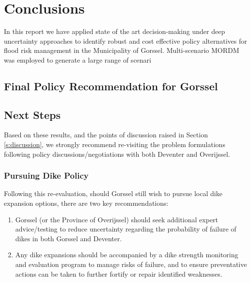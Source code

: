 \section{Conclusions}
\label{s:conc}


In this report we have applied state of the art decision-making under deep uncertainty approaches to identify robust and cost effective policy alternatives for flood risk management in the Municipality of Gorssel. Multi-scenario MORDM was employed to generate a large range of scenari

\subsection{Final Policy Recommendation for Gorssel}

\subsection{Next Steps}
Based on these results, and the points of discussion raised in Section \ref{s:discussion}, we strongly recommend re-visiting the problem formulations following policy discussions/negotiations with both Deventer and Overijssel.

\subsubsection{Pursuing Dike Policy}
Following this re-evaluation, should Gorssel still wish to pursue local dike expansion options, there are two key recommendations:
\begin{enumerate}
    \item Gorssel (or the Province of Overijssel) should seek additional expert advice/testing to reduce uncertainty regarding the probability of failure of dikes in both Gorssel and Deventer.
    \item Any dike expansions should be accompanied by a dike strength monitoring and evaluation program to manage risks of failure, and to ensure preventative actions can be taken to further fortify or repair identified weaknesses.
\end{enumerate}